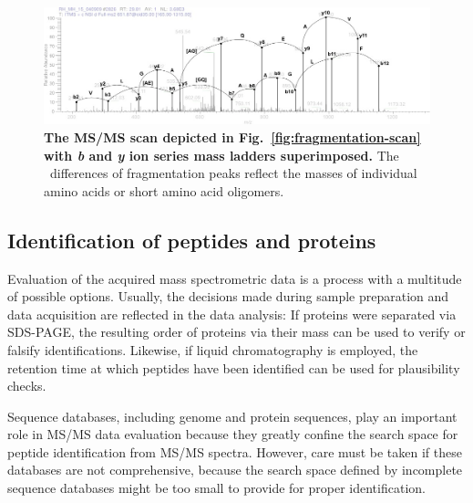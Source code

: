 \begin{figure}[h]
\includegraphics[width=\textwidth]{figures/ms2-scan-b-y-1.jpg}
\caption{
{\bf The MS/MS scan depicted in Fig.~\ref{fig:fragmentation-scan} with {\em b} and 
{\em y} ion series mass ladders superimposed.} 
The \mz~differences of fragmentation peaks reflect the masses of individual amino
acids or short amino acid oligomers.
}
\label{fig:fragmentation-scan-b-y}
\end{figure}


\subsection{Identification of peptides and proteins}

Evaluation of the acquired mass spectrometric data is a process with a multitude
of possible options.
Usually, the decisions made during sample preparation and data acquisition are
reflected in the data analysis: If proteins were separated via SDS-PAGE, the
resulting order of proteins via their mass can be used to verify or falsify 
identifications.
Likewise, if liquid chromatography is employed, the retention time at which
peptides have been identified can be used for plausibility checks.

Sequence databases, including genome and protein sequences, play an important
role in MS/MS data evaluation because they greatly confine the search space
for peptide identification from MS/MS spectra.
However, care must be taken if these databases are not comprehensive, because
the search space defined by incomplete sequence databases might be too small
to provide for proper identification.



